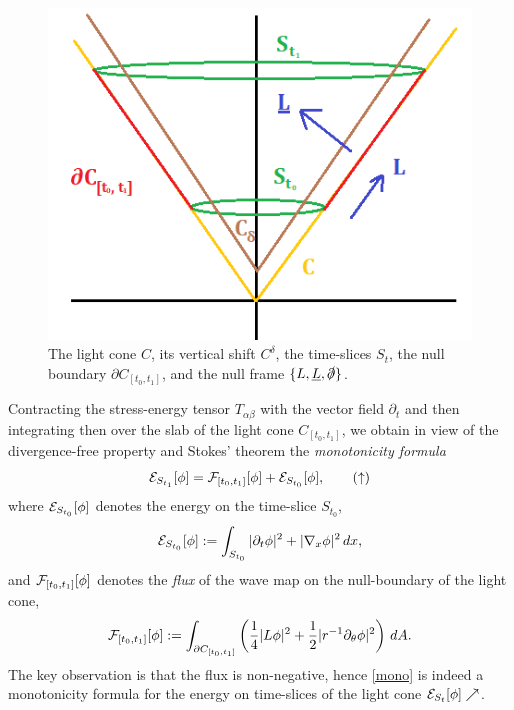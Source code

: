	
	\begin{figure}[h]
		\begin{center}
			\includegraphics{graphics/cone}
			\caption{The light cone $C$, its vertical shift $C^\delta$, the time-slices $S_{t}$, the null boundary $\partial C_{[t_0, t_1]}$, and the null frame $\{L, \underline L, \slashed\partial\}$. }
		\end{center}	
	\end{figure}	
Contracting the stress-energy tensor $T_{\alpha \beta}$ with the vector field $\partial_t$ and then integrating then over the slab of the light cone $C_{[t_0, t_1]}$, we obtain in view of the divergence-free property and Stokes' theorem the  \emph{monotonicity formula}
	\begin{equation}
		\mathcal E_{S_{t_1}} [\phi] = \mathcal F_{[t_0, t_1]} [\phi] + \mathcal E_{S_{t_0}} [\phi],
		\label{eq:mono}
		\tag{$\uparrow$}
	\end{equation}	
where $\mathcal E_{S_{t_0}} [\phi]$ denotes the energy on the time-slice $S_{t_0}$, 
	\[ \mathcal E_{S_{t_0}} [\phi] := \int_{S_{t_0}} |\partial_t \phi|^2 + |\nabla_x \phi|^2 \, dx ,\]
and $\mathcal F_{[t_0, t_1]} [\phi]$ denotes the \emph{flux} of the wave map on the null-boundary of the light cone,
	\[
		\mathcal F_{[t_0, t_1]} [\phi] := \int_{\partial C_{[t_0, t_1]}} \left( \frac14 |L \phi|^2 + \frac12 |r^{-1} \partial_\theta \phi|^2 \right) \, dA.
	\]
The key observation is that the flux is non-negative, hence \eqref{mono} is indeed a monotonicity formula for the energy on time-slices of the light cone $\mathcal E_{S_t} [\phi] \nearrow$. 
	